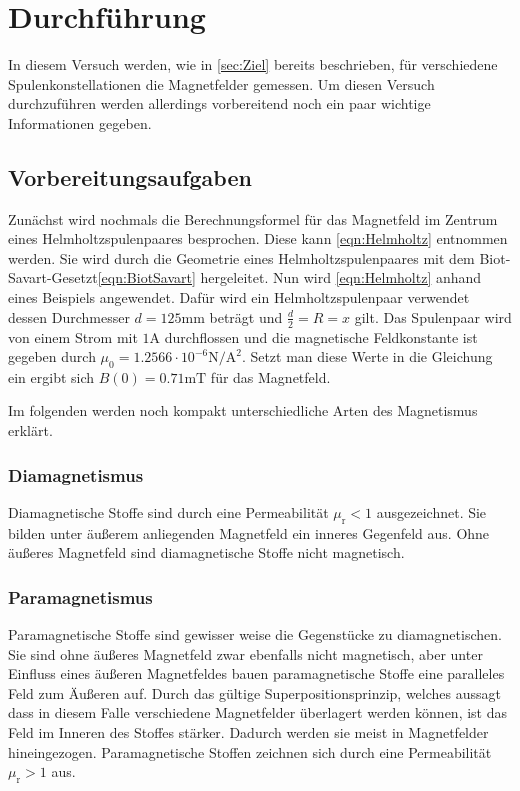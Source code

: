 \section{Durchführung}
\label{sec:Durchführung}
In diesem Versuch werden, wie in \autoref{sec:Ziel} bereits beschrieben, für verschiedene Spulenkonstellationen die Magnetfelder gemessen. Um diesen Versuch durchzuführen werden
allerdings vorbereitend noch ein paar wichtige Informationen gegeben.
\subsection{Vorbereitungsaufgaben}
\label{subsec:VBA}
Zunächst wird nochmals die Berechnungsformel für das Magnetfeld im Zentrum eines Helmholtzspulenpaares besprochen. Diese kann \autoref{eqn:Helmholtz}
entnommen werden. Sie wird durch die Geometrie eines Helmholtzspulenpaares mit dem Biot-Savart-Gesetzt\eqref{eqn:BiotSavart} hergeleitet. Nun wird \autoref{eqn:Helmholtz}
anhand eines Beispiels angewendet. Dafür wird ein Helmholtzspulenpaar verwendet dessen Durchmesser $d = 125\unit{\milli\metre}$ beträgt und $\frac{d}{2} = R = x$ gilt. Das Spulenpaar 
wird von einem Strom mit $1\unit{\ampere}$ durchflossen und die magnetische Feldkonstante ist gegeben durch $\mu_0 = 1.2566\cdot 10^{-6} \unit{\newton\per\ampere\squared}$\cite{scipy}. Setzt man diese Werte in die Gleichung ein
ergibt sich $B(0) = 0.71\unit{\milli\tesla}$ für das Magnetfeld. 


Im folgenden werden noch kompakt unterschiedliche Arten des Magnetismus erklärt. 
\subsubsection{Diamagnetismus}
\label{subsubsec:DIA}
Diamagnetische Stoffe sind durch eine Permeabilität $\mu_{\text{r}} < 1$ ausgezeichnet. Sie bilden unter äußerem anliegenden Magnetfeld ein inneres Gegenfeld aus. Ohne äußeres Magnetfeld sind 
diamagnetische Stoffe nicht magnetisch. 
\subsubsection{Paramagnetismus}
\label{subsubsec:PARA}
Paramagnetische Stoffe sind gewisser weise die Gegenstücke zu diamagnetischen. Sie sind ohne äußeres Magnetfeld zwar ebenfalls nicht magnetisch, aber unter Einfluss eines äußeren 
Magnetfeldes bauen paramagnetische Stoffe eine paralleles Feld zum Äußeren auf. Durch das gültige Superpositionsprinzip, welches aussagt dass in diesem Falle verschiedene Magnetfelder
überlagert werden können, ist das Feld im Inneren des Stoffes stärker. Dadurch werden sie meist in Magnetfelder hineingezogen. Paramagnetische Stoffen zeichnen sich durch eine 
Permeabilität $\mu_{\text{r}} > 1$ aus. 
